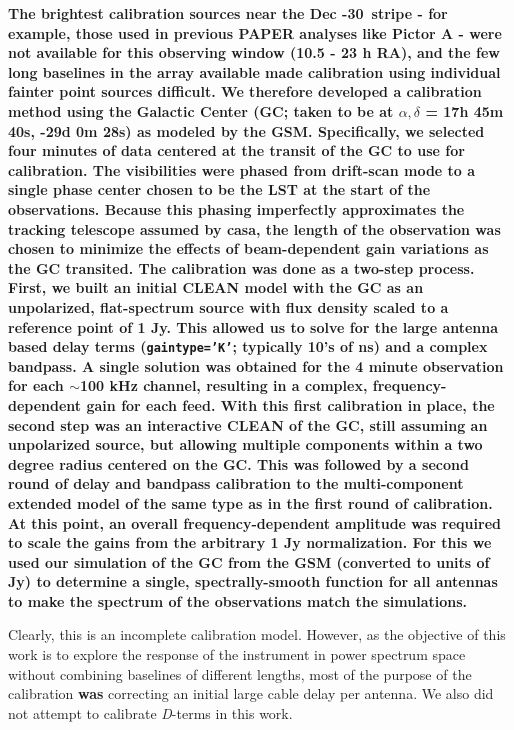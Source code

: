\documentclass[twocolumn, trackchanges]{aastex61}
\newcommand{\casa}{{\sc casa}}
\newcommand{\edited}[1]{{\bf \color{red} #1}}
\begin{document}
\edited{The brightest calibration sources near the Dec -30\arcdeg\ stripe - for example, those used in previous PAPER analyses like Pictor A \citep{jacobs13b} - were not available for this observing window (10.5 - 23 h RA), and the few long baselines in the array available made calibration using individual fainter point sources difficult.  We therefore developed a calibration method using the Galactic Center (GC; taken to be at $\alpha, \delta$ = 17h 45m 40s, -29d 0m 28s) as modeled by the GSM. Specifically, we selected four minutes of data centered at the transit of the GC to use for calibration.   The visibilities were phased from drift-scan mode to a single phase center chosen to be the LST at the start of the observations.  Because this phasing imperfectly approximates the tracking telescope assumed by \casa, the length of the observation was chosen to minimize the effects of beam-dependent gain variations as the GC transited.  The calibration was done as a two-step process.  First, we built an initial CLEAN model with the GC as an unpolarized, flat-spectrum source with flux density scaled to a reference point of 1 Jy.  This allowed us to solve for the large antenna based delay terms ({\tt gaintype='K'}; typically 10's of ns) and a complex bandpass.  A single solution was obtained for the 4 minute observation for each $\sim$100 kHz channel, resulting in a complex, frequency-dependent gain for each feed.	 With this first calibration in place, the second step was an interactive CLEAN of the GC, still assuming an unpolarized source, but allowing multiple components within a two degree radius centered on the GC.  This was followed by a second round of delay and bandpass calibration to the multi-component extended model of the same type as in the first round of calibration.  At this point, an overall frequency-dependent amplitude was required to scale the gains from the arbitrary 1 Jy normalization.  For this we used our simulation of the GC from the GSM (converted to units of Jy) to determine a single, spectrally-smooth function for all antennas to make the spectrum of the observations match the simulations.}

Clearly, this is an incomplete calibration model. However, as the objective of this work is to explore the response of the instrument in power spectrum space without combining baselines of different lengths, most of the purpose of the calibration \edited{was} correcting an initial large cable delay per antenna. We also did not attempt to calibrate \textit{D}-terms in this work.
\end{document}
